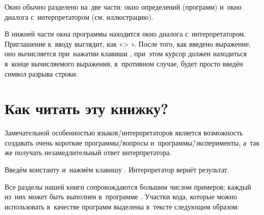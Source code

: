 Окно  обычно разделено на~две части: окно определений (программ) и~окно диалога с~интерпретатором (см. иллюстрацию).
\vspace{-\medskipamount}
\begin{center}
\end{center}

В нижней части окна программы  находится окно диалога с~интерпретатором. Приглашение к~вводу выглядит, как «> ». После того, как введено выражение, оно вычисляется при~нажатии клавиши , при~этом курсор должен находиться в~конце вычисляемого выражения, в~противном случае, будет просто введён символ разрыва строки.

\section{Как читать эту книжку?}%
Замечательной особенностью языков\=/интерпретаторов является возможность создавать очень короткие программы\=/вопросы и~программы\=/эксперименты, а~так же получать незамедлительный ответ интерпретатора. 

\begin{example}{%
Введём константу и~нажмём клавишу . Интерпретатор вернёт результат.}
\end{example}

Все разделы нашей книги сопровождаются большим числом примеров; каждый из~них может быть выполнен в~программе . Участки кода, которые можно использовать в~качестве программ выделены в~тексте следующим образом:

